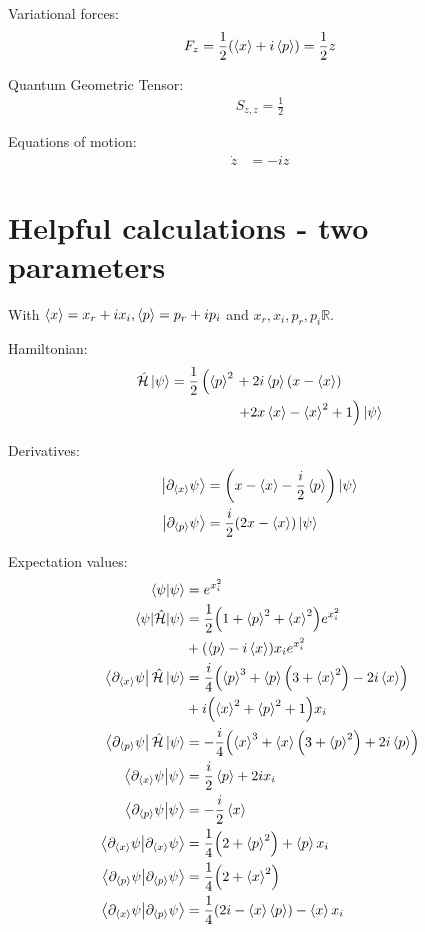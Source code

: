 \documentclass[aps,pre,superscriptaddress,amsmath,amssymb,amsfonts,twocolumn,showpacs,notitlepage]{revtex4-1}
\begin{document}
	Variational forces:
	\begin{align}
		F_{z} = \frac{1}{2} (\ev{x} + i\ev{p}) = \frac{1}{2}z
	\end{align}
	
	Quantum Geometric Tensor:
	\begin{align}
		S_{z,z} = \frac{1}{2}
	\end{align}
	
	Equations of motion:
	\begin{align}
		\dot{z} &= -iz
	\end{align}
	
\section{Helpful calculations - two parameters} \label{app:help2}

	With $\ev{x}=x_r+ix_i, \ev{p}=p_r+ip_i$ and $x_r,x_i,p_r,p_i \mathbb{R}$.
	
	Hamiltonian:
	\begin{align}		
		\hat{\mathcal{H}}\ket{\psi} = \frac{1}{2}\left(\ev{p}^2\right.
		&+2 i \ev{p} (x-\ev{x}) \nonumber \\
		&\left.+2 x \ev{x}-\ev{x}^2+1\right)\ket{\psi}		
	\end{align}	
	
	Derivatives:
	\begin{align}
		\ket{\partial_{\ev{x}}\psi} &= \qty(x-\ev{x}-\frac{i}{2}\ev{p})\ket{\psi}
		\\
		\ket{\partial_{\ev{p}}\psi} &= \frac{i}{2}(2x-\ev{x})\ket{\psi}		
	\end{align}
	
	Expectation values:
	\begin{align}
		\braket{\psi}{\psi} &= e^{x_i^2}
		\\		
		\ev{\hat{\mathcal{H}}}{\psi} &= \frac{1}{2}\qty(1+\ev{p}^2+\ev{x}^2)e^{x_i^2} \nonumber \\ &+ \qty(\ev{p}-i\ev{x})x_ie^{x_i^2}
		\\
		\bra{\partial_{\ev{x}}\psi}\hat{\mathcal{H}}\ket{\psi} &= \frac{i}{4}\qty(\ev{p}^3+\ev{p}\qty(3+\ev{x}^2)-2i\ev{x}) \nonumber \\
		&+i\qty(\ev{x}^2+\ev{p}^2+1)x_i
		\\
		\bra{\partial_{\ev{p}}\psi}\hat{\mathcal{H}}\ket{\psi} &= -\frac{i}{4}\qty(\ev{x}^3+\ev{x}\qty(3+\ev{p}^2)+2i\ev{p})
		\\
		\braket{\partial_{\ev{x}}\psi}{\psi} &= \frac{i}{2}\ev{p} + 2ix_i
		\\
		\braket{\partial_{\ev{p}}\psi}{\psi} &= -\frac{i}{2}\ev{x}
		\\
		\braket{\partial_{\ev{x}}\psi}{\partial_{\ev{x}}\psi} &= \frac{1}{4}\qty(2+\ev{p}^2) + \ev{p}x_i
		\\
		\braket{\partial_{\ev{p}}\psi}{\partial_{\ev{p}}\psi} &= \frac{1}{4}\qty(2+\ev{x}^2)
		\\
		\braket{\partial_{\ev{x}}\psi}{\partial_{\ev{p}}\psi} &= \frac{1}{4}(2i-\ev{x}\ev{p}) - \ev{x}x_i	
	\end{align}
	
\end{document}
